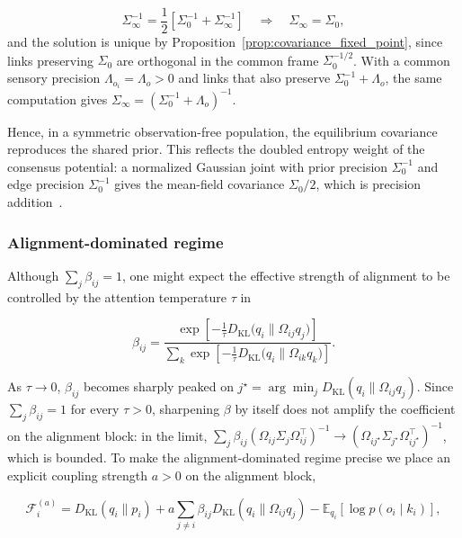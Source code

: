 \begin{equation}
\Sigma_\infty^{-1}
=\frac{1}{2}
\left[
\Sigma_0^{-1}
+ \Sigma_\infty^{-1}
\right]
\quad\Longrightarrow\quad
\Sigma_\infty = \Sigma_0,
\end{equation}
and the solution is unique by Proposition~\ref{prop:covariance_fixed_point}, since links preserving $\Sigma_0$ are orthogonal in the common frame $\Sigma_0^{-1/2}$. With a common sensory precision $\Lambda_{o_i} = \Lambda_o > 0$ and links that also preserve $\Sigma_0^{-1} + \Lambda_o$, the same computation gives $\Sigma_\infty = (\Sigma_0^{-1} + \Lambda_o)^{-1}$.

Hence, in a symmetric observation-free population, the equilibrium covariance reproduces the shared prior. This reflects the doubled entropy weight of the consensus potential: a normalized Gaussian joint with prior precision $\Sigma_0^{-1}$ and edge precision $\Sigma_0^{-1}$ gives the mean-field covariance $\Sigma_0/2$, which is precision addition~\cite[Ch.~G4, block optimum]{DennisGaugeVFESuppG2026}.

\subsubsection{Alignment-dominated regime}

Although $\sum_j \beta_{ij} = 1$, one might expect the effective strength of alignment to be controlled by the attention temperature $\tau$ in

\begin{equation}
\beta_{ij}
=\frac{
\exp\left[
-\frac{1}{\tau}
D_{\mathrm{KL}}\big(q_i \| \Omega_{ij} q_j\big)
\right]
}{\sum_k
\exp\left[
-\frac{1}{\tau}
D_{\mathrm{KL}}\big(q_i \| \Omega_{ik} q_k\big)
\right]}.
\end{equation}

As $\tau \to 0$, $\beta_{ij}$ becomes sharply peaked on $j^\star = \arg\min_j D_{\mathrm{KL}}(q_i \| \Omega_{ij}q_j)$. Since $\sum_j \beta_{ij} = 1$ for every $\tau > 0$, sharpening $\beta$ by itself does not amplify the coefficient on the alignment block: in the limit, $\sum_j \beta_{ij}(\Omega_{ij}\Sigma_j\Omega_{ij}^\top)^{-1} \to (\Omega_{ij^\star}\Sigma_{j^\star}\Omega_{ij^\star}^\top)^{-1}$, which is bounded. To make the alignment-dominated regime precise we place an explicit coupling strength $a > 0$ on the alignment block,

\begin{equation}
\mathcal{F}_i^{(a)}
=D_{\mathrm{KL}}(q_i \| p_i)
+ a \sum_{j \neq i} \beta_{ij}
D_{\mathrm{KL}}(q_i \| \Omega_{ij} q_j)
- \mathbb{E}_{q_i}[\log p(o_i \mid k_i)],
\end{equation}

